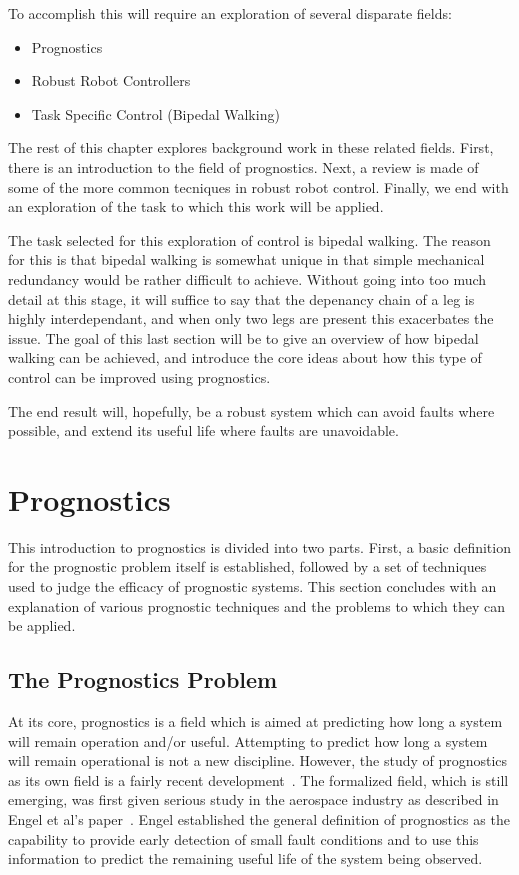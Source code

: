 \documentclass[12pt]{article}
\begin{document}
To accomplish this will require an exploration of several disparate
fields:
\begin{itemize}
\item Prognostics
\item Robust Robot Controllers
\item Task Specific Control (Bipedal Walking)
\end{itemize}
The rest of this chapter explores background work in these related
fields.  First, there is an introduction to the field of prognostics.
Next, a review is made of some of the more common tecniques in robust
robot control.  Finally, we end with an exploration of the task to
which this work will be applied.

The task selected for this exploration of control is bipedal walking.
The reason for this is that bipedal walking is somewhat unique in that
simple mechanical redundancy would be rather difficult to achieve.
Without going into too much detail at this stage, it will suffice to
say that the depenancy chain of a leg is highly interdependant, and
when only two legs are present this exacerbates the issue.  The goal
of this last section will be to give an overview of how bipedal
walking can be achieved, and introduce the core ideas about how this
type of control can be improved using prognostics.

The end result will, hopefully, be a robust system which can avoid
faults where possible, and extend its useful life where faults are
unavoidable.

\section{Prognostics}
This introduction to prognostics is divided into two parts.  First, a
basic definition for the prognostic problem itself is established,
followed by a set of techniques used to judge the efficacy of
prognostic systems.  This section concludes with an explanation of
various prognostic techniques and the problems to which they can be
applied.


\subsection{The Prognostics Problem}
At its core, prognostics is a field which is aimed at predicting how
long a system will remain operation and/or useful.  Attempting to
predict how long a system will remain operational is not a new
discipline.  However, the study of prognostics as its own field is a
fairly recent development~\cite{877920}.  The formalized field, which
is still emerging, was first given serious study in the aerospace
industry as described in Engel et al's paper~\cite{877920}.  Engel
established the general definition of prognostics as the capability to
provide early detection of small fault conditions and to use this
information to predict the remaining useful life of the system being
observed.
\end{document}
